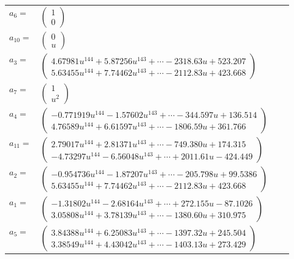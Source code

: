 \documentclass[1p]{elsarticle_modified}
\theoremstyle{definition}
\begin{document}
\begin{tabular}{m{7pt} m{180pt} m{7pt} m{180pt} }
\flushright $a_{6}=$&$\begin{pmatrix}1\\0\end{pmatrix}$ \\
\flushright $a_{10}=$&$\begin{pmatrix}0\\u\end{pmatrix}$ \\
\flushright $a_{3}=$&$\begin{pmatrix}4.67981 u^{144}+5.87256 u^{143}+\cdots-2318.63 u+523.207\\5.63455 u^{144}+7.74462 u^{143}+\cdots-2112.83 u+423.668\end{pmatrix}$ \\
\flushright $a_{7}=$&$\begin{pmatrix}1\\u^2\end{pmatrix}$ \\
\flushright $a_{4}=$&$\begin{pmatrix}-0.771919 u^{144}-1.57602 u^{143}+\cdots-344.597 u+136.514\\4.76589 u^{144}+6.61597 u^{143}+\cdots-1806.59 u+361.766\end{pmatrix}$ \\
\flushright $a_{11}=$&$\begin{pmatrix}2.79017 u^{144}+2.81371 u^{143}+\cdots-749.380 u+174.315\\-4.73297 u^{144}-6.56048 u^{143}+\cdots+2011.61 u-424.449\end{pmatrix}$ \\
\flushright $a_{2}=$&$\begin{pmatrix}-0.954736 u^{144}-1.87207 u^{143}+\cdots-205.798 u+99.5386\\5.63455 u^{144}+7.74462 u^{143}+\cdots-2112.83 u+423.668\end{pmatrix}$ \\
\flushright $a_{1}=$&$\begin{pmatrix}-1.31802 u^{144}-2.68164 u^{143}+\cdots+272.155 u-87.1026\\3.05808 u^{144}+3.78139 u^{143}+\cdots-1380.60 u+310.975\end{pmatrix}$ \\
\flushright $a_{5}=$&$\begin{pmatrix}3.84388 u^{144}+6.25083 u^{143}+\cdots-1397.32 u+245.504\\3.38549 u^{144}+4.43042 u^{143}+\cdots-1403.13 u+273.429\end{pmatrix}$ \\

\end{tabular}
\end{document}
